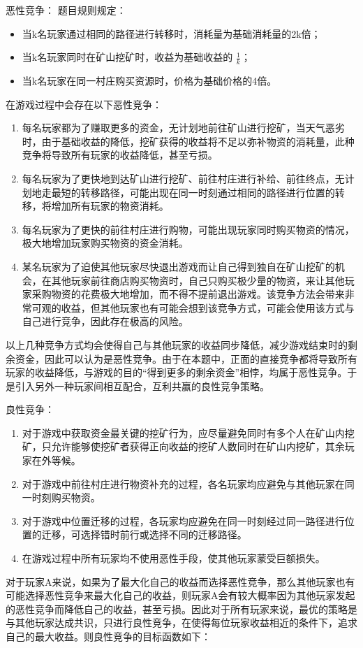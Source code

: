 \documentclass[UTF8]{article}
\begin{document}
恶性竞争：
题目规则规定：
\begin{itemize}
    \item 当k名玩家通过相同的路径进行转移时，消耗量为基础消耗量的2k倍；
    \item 当k名玩家同时在矿山挖矿时，收益为基础收益的 \(\frac{1}{k}\)；
    \item 当k名玩家在同一村庄购买资源时，价格为基础价格的4倍。
\end{itemize}
在游戏过程中会存在以下恶性竞争：
\begin{enumerate}
    \item 每名玩家都为了赚取更多的资金，无计划地前往矿山进行挖矿，当天气恶劣时，由于基础收益的降低，挖矿获得的收益将不足以弥补物资的消耗量，此种竞争将导致所有玩家的收益降低，甚至亏损。
    \item 每名玩家为了更快地到达矿山进行挖矿、前往村庄进行补给、前往终点，无计划地走最短的转移路径，可能出现在同一时刻通过相同的路径进行位置的转移，将增加所有玩家的物资消耗。
    \item 每名玩家为了更快的前往村庄进行购物，可能出现玩家同时购买物资的情况，极大地增加玩家购买物资的资金消耗。
    \item 某名玩家为了迫使其他玩家尽快退出游戏而让自己得到独自在矿山挖矿的机会，在其他玩家前往商店购买物资时，自己只购买极少量的物资，来让其他玩家采购物资的花费极大地增加，而不得不提前退出游戏。该竞争方法会带来非常可观的收益，但其他玩家也有可能会想到该竞争方式，可能会使用该方式与自己进行竞争，因此存在极高的风险。
\end{enumerate}
以上几种竞争方式均会使得自己与其他玩家的收益同步降低，减少游戏结束时的剩余资金，因此可以认为是恶性竞争。由于在本题中，正面的直接竞争都将导致所有玩家的收益降低，与游戏的目的“得到更多的剩余资金”相悖，均属于恶性竞争。于是引入另外一种玩家间相互配合，互利共赢的良性竞争策略。

良性竞争：
\begin{enumerate}
    \item 对于游戏中获取资金最关键的挖矿行为，应尽量避免同时有多个人在矿山内挖矿，只允许能够使挖矿者获得正向收益的挖矿人数同时在矿山内挖矿，其余玩家在外等候。
    \item 对于游戏中前往村庄进行物资补充的过程，各名玩家均应避免与其他玩家在同一时刻购买物资。
    \item 对于游戏中位置迁移的过程，各玩家均应避免在同一时刻经过同一路径进行位置的迁移，可选择错时前行或选择不同的迁移路径。
    \item 在游戏过程中所有玩家均不使用恶性手段，使其他玩家蒙受巨额损失。
\end{enumerate}
对于玩家A来说，如果为了最大化自己的收益而选择恶性竞争，那么其他玩家也有可能选择恶性竞争来最大化自己的收益，则玩家A会有较大概率因为其他玩家发起的恶性竞争而降低自己的收益，甚至亏损。因此对于所有玩家来说，最优的策略是与其他玩家达成共识，只进行良性竞争，在使得每位玩家收益相近的条件下，追求自己的最大收益。则良性竞争的目标函数如下：
\end{document}
